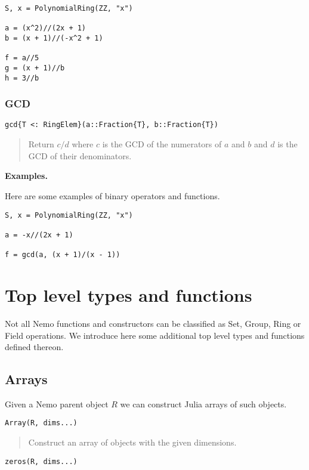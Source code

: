 \documentclass[a4paper,10pt]{article}
\newcommand{\desc}[1]{\vspace{-3mm}\begin{quote}#1\end{quote}}
\begin{document}
\begin{lstlisting}
S, x = PolynomialRing(ZZ, "x")

a = (x^2)//(2x + 1)
b = (x + 1)//(-x^2 + 1)

f = a//5
g = (x + 1)//b
h = 3//b
\end{lstlisting}

\subsubsection{GCD}

\begin{lstlisting}
gcd{T <: RingElem}(a::Fraction{T}, b::Fraction{T})
\end{lstlisting}

\desc{Return $c/d$ where $c$ is the GCD of the numerators of $a$ and $b$ and
$d$ is the GCD of their denominators.}

\textbf{Examples.}

Here are some examples of binary operators and functions.

\begin{lstlisting}
S, x = PolynomialRing(ZZ, "x")

a = -x//(2x + 1)

f = gcd(a, (x + 1)/(x - 1))
\end{lstlisting}

\section{Top level types and functions}

Not all Nemo functions and constructors can be classified as Set, Group, Ring or Field
operations. We introduce here some additional top level types and functions defined
thereon.

\subsection{Arrays}

Given a Nemo parent object $R$ we can construct Julia arrays of such objects.

\begin{lstlisting}
Array(R, dims...)
\end{lstlisting}

\desc{Construct an array of objects with the given dimensions.}

\begin{lstlisting}
zeros(R, dims...)
\end{lstlisting}
\end{document}
